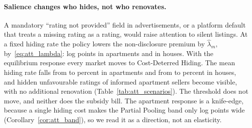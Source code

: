 \paragraph{Salience changes who hides, not who renovates.}
A mandatory ``rating not provided'' field in advertisements, or a platform default that treats a missing rating as a rating, would raise attention to silent listings. At a fixed hiding rate the policy lowers the non-disclosure premium by $\hat\lambda_m$, by~\eqref{eq:att_lambda}: \attSalienceApt{} log points in apartments and \attSalienceHouse{} in houses. With the equilibrium response every market moves to Cost-Deterred Hiding. The mean hiding rate falls from \attSigmaObsApt{} to \attSigmaFullApt{} percent in apartments and from \attSigmaObsHouse{} to \attSigmaFullHouse{} percent in houses, and \attCfRevealedApt{} hidden unfavourable ratings of informed apartment sellers become visible, with no additional renovation (Table~\ref{tab:att_scenarios}). The threshold does not move, and neither does the subsidy bill. The apartment response is a knife-edge, because a single hiding cost makes the Partial Pooling band only \attBandWidthApt{} log points wide (Corollary~\ref{cor:att_band}), so we read it as a direction, not an elasticity.
